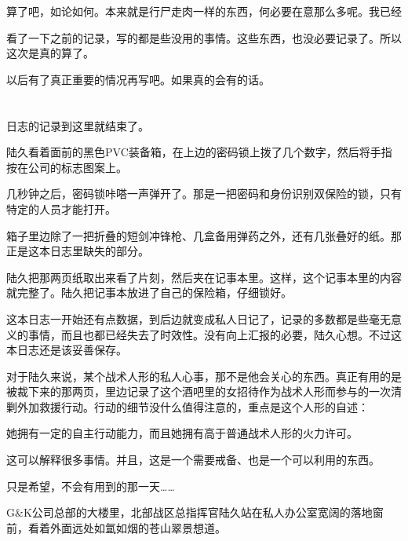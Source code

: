 算了吧，如论如何。本来就是行尸走肉一样的东西，何必要在意那么多呢。我已经

看了一下之前的记录，写的都是些没用的事情。这些东西，也没必要记录了。所以这次是真的算了。

以后有了真正重要的情况再写吧。如果真的会有的话。

\lineseparator

\section*{}
日志的记录到这里就结束了。

陆久看着面前的黑色PVC装备箱，在上边的密码锁上拨了几个数字，然后将手指按在公司的标志图案上。

几秒钟之后，密码锁咔嗒一声弹开了。那是一把密码和身份识别双保险的锁，只有特定的人员才能打开。

箱子里边除了一把折叠的短剑冲锋枪、几盒备用弹药之外，还有几张叠好的纸。那正是这本日志里缺失的部分。

陆久把那两页纸取出来看了片刻，然后夹在记事本里。这样，这个记事本里的内容就完整了。陆久把记事本放进了自己的保险箱，仔细锁好。

这本日志一开始还有点数据，到后边就变成私人日记了，记录的多数都是些毫无意义的事情，而且也都已经失去了时效性。没有向上汇报的必要，陆久心想。不过这本日志还是该妥善保存。

对于陆久来说，某个战术人形的私人心事，那不是他会关心的东西。真正有用的是被裁下来的那两页，里边记录了这个酒吧里的女招待作为战术人形而参与的一次清剿外加救援行动。行动的细节没什么值得注意的，重点是这个人形的自述：

她拥有一定的自主行动能力，而且她拥有高于普通战术人形的火力许可。

这可以解释很多事情。并且，这是一个需要戒备、也是一个可以利用的东西。

只是希望，不会有用到的那一天……

G\&K公司总部的大楼里，北部战区总指挥官陆久站在私人办公室宽阔的落地窗前，看着外面远处如氲如烟的苍山翠景想道。
\setcounter{secnumdepth}{0}


